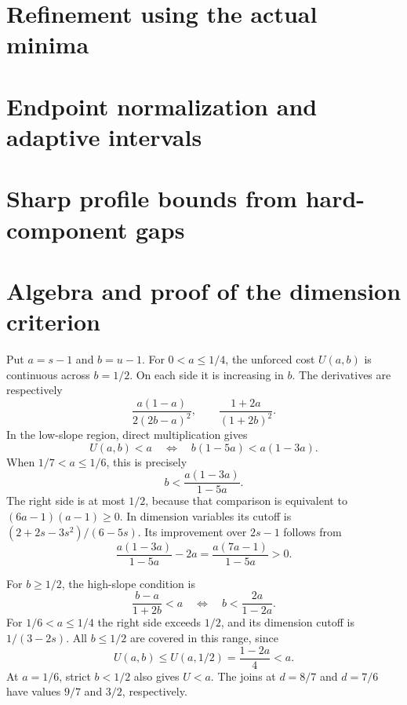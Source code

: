 \documentclass[11pt]{article}
\theoremstyle{definition}\newtheorem{remark}[theorem]{Remark}
\begin{document}
\clearpage








\clearpage
\section{Refinement using the actual minima}\label{minimum:section}


\clearpage
\section{Endpoint normalization and adaptive intervals}\label{adaptive:section}


\clearpage
\section{Sharp profile bounds from hard-component gaps}\label{hardgap:section}



\section{Algebra and proof of the dimension criterion}
Put \(a=s-1\) and \(b=u-1\). For \(0<a\le1/4\), the unforced cost
\(U(a,b)\) is continuous across \(b=1/2\). On each side it is increasing
in \(b\). The derivatives are respectively
$$
 \frac{a(1-a)}{2(2b-a)^2},\qquad
 \frac{1+2a}{(1+2b)^2}.
$$
In the low-slope region, direct multiplication gives
$$
 U(a,b)<a\quad\Longleftrightarrow\quad
 b(1-5a)<a(1-3a).
$$
When \(1/7<a\le1/6\), this is precisely
$$
 b<\frac{a(1-3a)}{1-5a}.
$$
The right side is at most \(1/2\), because that comparison is equivalent to
\((6a-1)(a-1)\ge0\). In dimension variables its cutoff is
\((2+2s-3s^2)/(6-5s)\). Its improvement over \(2s-1\) follows from
$$
 \frac{a(1-3a)}{1-5a}-2a=\frac{a(7a-1)}{1-5a}>0.
$$

For \(b\ge1/2\), the high-slope condition is
$$
 \frac{b-a}{1+2b}<a
 \quad\Longleftrightarrow\quad
 b<\frac{2a}{1-2a}.
$$
For \(1/6<a\le1/4\) the right side exceeds \(1/2\), and its dimension
cutoff is \(1/(3-2s)\). All \(b\le1/2\) are covered in this range, since
$$
 U(a,b)\le U(a,1/2)=\frac{1-2a}{4}<a.
$$
At \(a=1/6\), strict \(b<1/2\) also gives \(U<a\).
The joins at \(d=8/7\) and \(d=7/6\) have values \(9/7\) and \(3/2\),
respectively.
\end{document}
